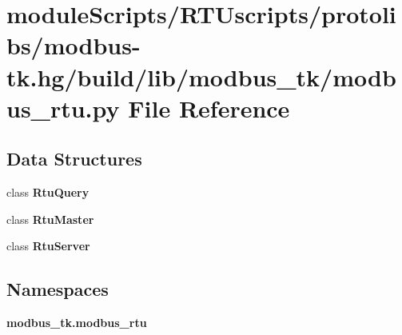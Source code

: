 \section{module\+Scripts/\+R\+T\+Uscripts/protolibs/modbus-\/tk.hg/build/lib/modbus\+\_\+tk/modbus\+\_\+rtu.py File Reference}
\label{modbus-tk_8hg_2build_2lib_2modbus__tk_2modbus__rtu_8py}
\subsection*{Data Structures}
\begin{DoxyCompactItemize}
\item 
class {\bf Rtu\+Query}
\item 
class {\bf Rtu\+Master}
\item 
class {\bf Rtu\+Server}
\end{DoxyCompactItemize}
\subsection*{Namespaces}
\begin{DoxyCompactItemize}
\item 
 {\bf modbus\+\_\+tk.\+modbus\+\_\+rtu}
\end{DoxyCompactItemize}
